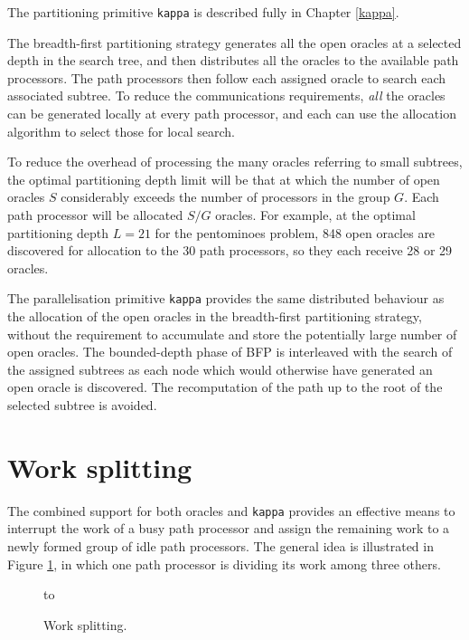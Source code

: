 The partitioning primitive \texttt{kappa} is described fully in Chapter \ref{kappa}.

The breadth-first partitioning strategy generates all the open oracles at a
selected depth in the search tree, and then distributes all the oracles to the
available path processors.  The path processors then follow each assigned oracle
to search each associated subtree.  To reduce the communications requirements,
\textit{all} the oracles can be generated locally at every path processor, and
each can use the allocation algorithm to select those for local search.

To reduce the overhead of processing the many oracles referring to small
subtrees, the optimal partitioning depth limit will be that at which the number
of open oracles $S$ considerably exceeds the number of processors in the 
group $G$.  Each path processor will be allocated $S/G$ oracles.  For example,
at the optimal partitioning depth $L=21$ for the pentominoes problem, 848
open oracles are discovered for allocation to the 30 path processors, so they
each receive 28 or 29 oracles.

The parallelisation primitive \texttt{kappa} provides the same 
distributed behaviour as the
allocation of the open oracles in the breadth-first partitioning strategy, without
the requirement to accumulate and store the potentially large 
number of open oracles.  The
bounded-depth phase of BFP is interleaved with the search of the assigned
subtrees as each node which would otherwise have generated an open oracle is
discovered.  The recomputation of the path up to the root of the selected subtree
is avoided.

\section{Work splitting} %

The combined support for both oracles and \texttt{kappa} provides an effective
means to interrupt the work of a busy path processor and assign the remaining
work to a newly formed group of idle path processors.  The general idea is
illustrated in Figure \ref{splitting}, in which one path processor is dividing
its work among three others.

\begin{figure}[htb]
\vspace{5mm} \hbox to 
\caption{Work splitting.}
\vspace{5mm}
\label{splitting}
\end{figure}

